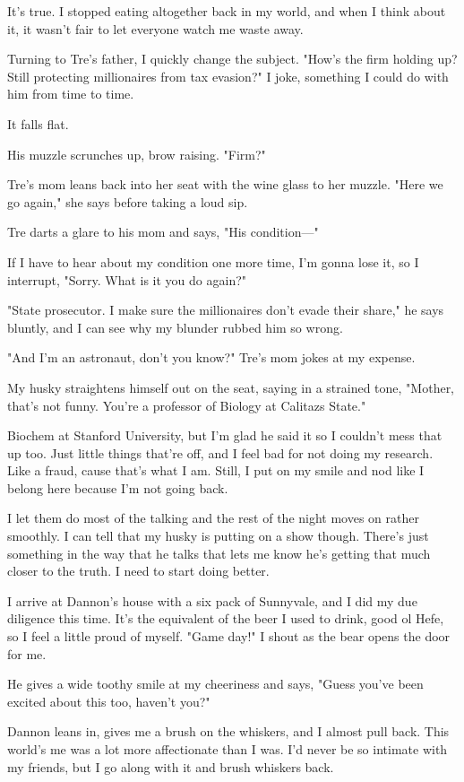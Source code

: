 It's true. I stopped eating altogether back in my world, and when I think about it, it wasn't fair to let everyone watch me waste away.

Turning to Tre's father, I quickly change the subject. "How's the firm holding up? Still protecting millionaires from tax evasion?" I joke, something I could do with him from time to time.

It falls flat.

His muzzle scrunches up, brow raising. "Firm?"

Tre's mom leans back into her seat with the wine glass to her muzzle. "Here we go again," she says before taking a loud sip.

Tre darts a glare to his mom and says, "His condition---"

If I have to hear about my condition one more time, I'm gonna lose it, so I interrupt, "Sorry. What is it you do again?"

"State prosecutor. I make sure the millionaires don't evade their share," he says bluntly, and I can see why my blunder rubbed him so wrong.

"And I'm an astronaut, don't you know?" Tre's mom jokes at my expense.

My husky straightens himself out on the seat, saying in a strained tone, "Mother, that's not funny. You're a professor of Biology at Calitazs State."

Biochem at Stanford University, but I'm glad he said it so I couldn't mess that up too. Just little things that're off, and I feel bad for not doing my research. Like a fraud, cause that's what I am. Still, I put on my smile and nod like I belong here because I'm not going back.

I let them do most of the talking and the rest of the night moves on rather smoothly. I can tell that my husky is putting on a show though. There's just something in the way that he talks that lets me know he's getting that much closer to the truth. I need to start doing better.

I arrive at Dannon's house with a six pack of Sunnyvale, and I did my due diligence this time. It's the equivalent of the beer I used to drink, good ol Hefe, so I feel a little proud of myself. "Game day!" I shout as the bear opens the door for me.

He gives a wide toothy smile at my cheeriness and says, "Guess you've been excited about this too, haven't you?"

Dannon leans in, gives me a brush on the whiskers, and I almost pull back. This world's me was a lot more affectionate than I was. I'd never be so intimate with my friends, but I go along with it and brush whiskers back.

